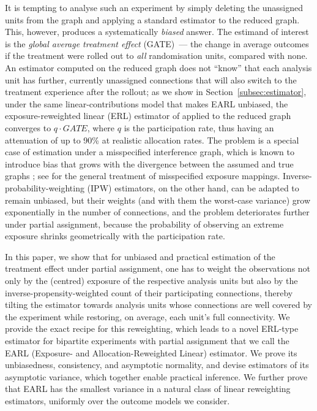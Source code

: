 \documentclass[sigconf,nonacm]{acmart}
\begin{document}
It is tempting to analyse such an experiment by simply deleting the unassigned units from the graph and applying a standard estimator to the reduced graph. This, however, produces a systematically \emph{biased} answer. The estimand of interest is the \emph{global average treatment effect} (GATE)~--- the change in average outcomes if the treatment were rolled out to \emph{all} randomisation units, compared with none. An estimator computed on the reduced graph does not ``know'' that each analysis unit has further, currently unassigned connections that will also switch to the treatment experience after the rollout; as we show in Section~\ref{subsec:estimator}, under the same linear-contributions model that makes EARL unbiased, the exposure-reweighted linear (ERL) estimator of \citet{harshaw2023erl} applied to the reduced graph converges to $q\cdot GATE$, where $q$ is the participation rate, thus having an attenuation of up to 90\% at realistic allocation rates. The problem is a special case of estimation under a misspecified interference graph, which is known to introduce bias that grows with the divergence between the assumed and true graphs \cite{weinstein2026causal}; see \cite{savje2024misspecified} for the general treatment of misspecified exposure mappings. Inverse-probability-weighting (IPW) estimators, on the other hand, can be adapted to remain unbiased, but their weights (and with them the worst-case variance) grow exponentially in the number of connections, and the problem deteriorates further under partial assignment, because the probability of observing an extreme exposure shrinks geometrically with the participation rate.

In this paper, we show that for unbiased and practical estimation of the treatment effect under partial assignment, one has to weight the observations not only by the (centred) exposure of the respective analysis units but also by the inverse-propensity-weighted count of their participating connections, thereby tilting the estimator towards analysis units whose connections are well covered by the experiment while restoring, on average, each unit's full connectivity. We provide the exact recipe for this reweighting, which leads to a novel ERL-type estimator for bipartite experiments with partial assignment that we call the EARL (Exposure- and Allocation-Reweighted Linear) estimator. We prove its unbiasedness, consistency, and asymptotic normality, and devise estimators of its asymptotic variance, which together enable practical inference. We further prove that EARL has the smallest variance in a natural class of linear reweighting estimators, uniformly over the outcome models we consider.
\end{document}
